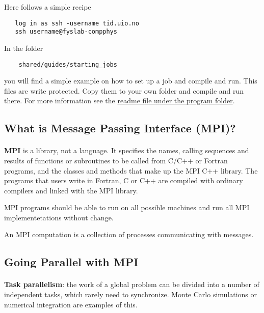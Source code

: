 \documentclass[%
oneside,                 %
final,                   %
10pt]{article}
\begin{document}
Here follows a simple recipe
\begin{verbatim}
   log in as ssh -username tid.uio.no
   ssh username@fyslab-compphys
\end{verbatim}
In the folder 
\begin{verbatim}
    shared/guides/starting_jobs 
\end{verbatim}
you will find a simple example on how to set up a job and compile and run.
This files are write protected. Copy them to your own folder and compile and run there. 
For more information see the \href{{https://github.com/CompPhysics/ComputationalPhysics2/tree/gh-pages/doc/Programs/ParallelizationMPI}}{readme file under the program folder}.






\subsection*{What is Message Passing Interface (MPI)?}

\paragraph{}

\textbf{MPI} is a library, not a language. It specifies the names, calling sequences and results of functions
or subroutines to be called from C/C++ or Fortran programs, and the classes and methods that make up the MPI C++
library. The programs that users write in Fortran, C or C++ are compiled with ordinary compilers and linked
with the MPI library.

MPI programs should be able to run
on all possible machines and run all MPI implementetations without change.

An MPI computation is a collection of processes communicating with messages.


\subsection*{Going Parallel with MPI}

\paragraph{}
\textbf{Task parallelism}: the work of a global problem can be divided
into a number of independent tasks, which rarely need to synchronize. 
Monte Carlo simulations or numerical integration are examples of this.
\end{document}

